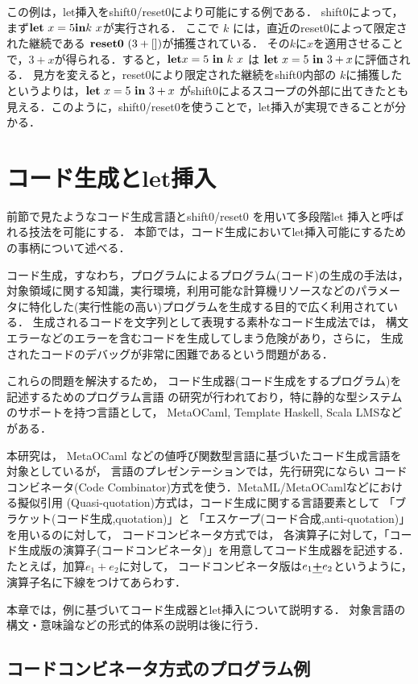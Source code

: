 この例は，let挿入をshift0/reset0により可能にする例である．
shift0によって，まず$\textbf{let}~ x = 5 \textbf{in} k~ x$が実行される．
ここで $k$ には，直近のreset0によって限定された継続である $\textbf{reset0}~ (3 + [])$が捕獲されている．
その$k$に$x$を適用させることで，$3+x$が得られる．すると，$\textbf{let} x = 5~ \textbf{in}~ k~ x$ は $\textbf{let}~ x = 5~ \textbf{in}~ 3 + x$に評価される．
見方を変えると，reset0により限定された継続をshift0内部の $k$に捕獲したというよりは，$\textbf{let}~ x = 5~ \textbf{in}~ 3 + x$ がshift0によるスコープの外部に出てきたとも見える．このように，shift0/reset0を使うことで，let挿入が実現できることが分かる．


\section{コード生成とlet挿入}
前節で見たようなコード生成言語とshift0/reset0 を用いて多段階let 挿入と呼ばれる技法を可能にする．
本節では，コード生成においてlet挿入可能にするための事柄について述べる．

コード生成，すなわち，プログラムによるプログラム(コード)の生成の手法は，
対象領域に関する知識，実行環境，利用可能な計算機リソースなどのパラメー
タに特化した(実行性能の高い)プログラムを生成する目的で広く利用されている．
生成されるコードを文字列として表現する素朴なコード生成法では，
構文エラーなどのエラーを含むコードを生成してしまう危険があり，さらに，
生成されたコードのデバッグが非常に困難であるという問題がある．

これらの問題を解決するため，
コード生成器(コード生成をするプログラム)を記述するためのプログラム言語
の研究が行われており，特に静的な型システムのサポートを持つ言語として，
MetaOCaml, Template Haskell, Scala LMSなどがある．

本研究は，
MetaOCaml などの値呼び関数型言語に基づいたコード生成言語を対象としているが，
言語のプレゼンテーションでは，先行研究にならい
コードコンビネータ(Code Combinator)方式を使う．MetaML/MetaOCamlなどにおける擬似引用
(Quasi-quotation)方式は，コード生成に関する言語要素として
「ブラケット(コード生成,quotation)」と
「エスケープ(コード合成,anti-quotation)」を用いるのに対して，
コードコンビネータ方式では，
各演算子に対して，「コード生成版の演算子(コードコンビネータ)」を用意してコード生成器を記述する．
たとえば，加算$e_1+e_2$に対して，
コードコンビネータ版は$e_1 \underline{\textbf{+}} e_2$というように，
演算子名に下線をつけてあらわす．

本章では，例に基づいてコード生成器とlet挿入について説明する．
対象言語の構文・意味論などの形式的体系の説明は後に行う．

\subsection{コードコンビネータ方式のプログラム例}

